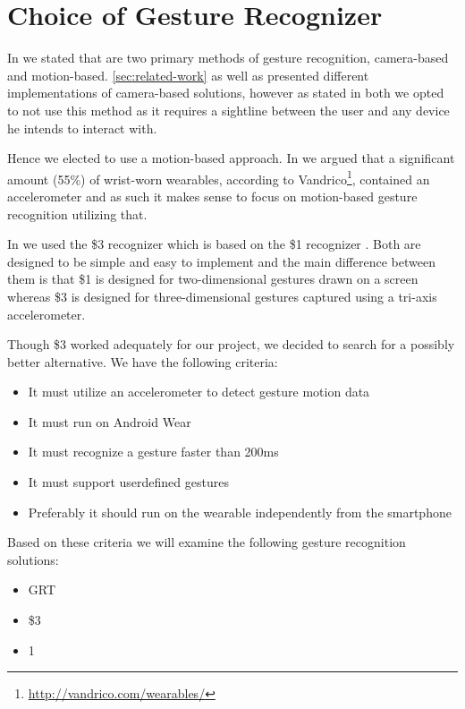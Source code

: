 \section{Choice of Gesture Recognizer}
\label{sec:analysis:choice-of-gesture-recognizer}

In \cite{prespecialisation} we stated that are two primary methods of gesture recognition, camera-based and motion-based.
\cref{sec:related-work} as well as \cite{prespecialisation} presented different implementations of camera-based solutions, however as stated in both we opted to not use this method as it requires a sightline between the user and any device he intends to interact with.

Hence we elected to use a motion-based approach.
In \cite{prespecialisation} we argued that a significant amount (55\%) of wrist-worn wearables, according to Vandrico\footnote{\url{http://vandrico.com/wearables/}}, contained an accelerometer and as such it makes sense to focus on motion-based gesture recognition utilizing that.

In \cite{prespecialisation} we used the \$3 recognizer \cite{threedollar} which is based on the \$1 recognizer \cite{wobbrock2007gestures}.
Both are designed to be simple and easy to implement and the main difference between them is that \$1 is designed for two-dimensional gestures drawn on a screen whereas \$3 is designed for three-dimensional gestures captured using a tri-axis accelerometer.

Though \$3 worked adequately for our project, we decided to search for a possibly better alternative.
We have the following criteria:

\begin{itemize}
    \item It must utilize an accelerometer to detect gesture motion data
    \item It must run on Android Wear
    \item It must recognize a gesture faster than 200ms
    \item It must support userdefined gestures
    \item Preferably it should run on the wearable independently from the smartphone
\end{itemize}
Based on these criteria we will examine the following gesture recognition solutions:

\begin{itemize}
    \item GRT \cite{gillian2011gesture, gillian2014gesture, gilliangesturegithub}
    \item \$3 \cite{threedollar}
    \item 1\textcent \cite{herold20121}
\end{itemize}
